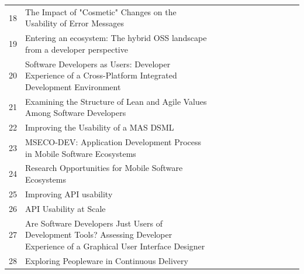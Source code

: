 \documentclass[english, 12pt, a4paper, sci, utf8, a-1b, online]{aaltothesis}
\begin{document}
\begin{center}
\begin{longtable}{p{0.05\linewidth}p{0.65\linewidth}p{0.30\linewidth}}
    18 & The Impact of "Cosmetic" Changes on the Usability of Error Messages                                                                         & \cite{dong2019impact}                             \\
    19 & Entering an ecosystem: The hybrid OSS landscape from a developer perspective                                                                & \cite{entering-an-ecosystem}                      \\
    20 & Software Developers as Users: Developer Experience of a Cross-Platform Integrated Development Environment                                   & \cite{software-developers-as-users}               \\
    21 & Examining the Structure of Lean and Agile Values Among Software Developers                                                                  & \cite{fagerholm2014examining}                     \\
    22 & Improving the Usability of a MAS DSML                                                                                                       & \cite{miranda2018improving}                       \\
    23 & MSECO-DEV: Application Development Process in Mobile Software Ecosystems                                                                    & \cite{fontao2016mseco}                            \\
    24 & Research Opportunities for Mobile Software Ecosystems                                                                                       & \cite{fontao2015research}                         \\
    25 & Improving API usability                                                                                                                     & \cite{myers2016improving}                         \\
    26 & API Usability at Scale                                                                                                                      & \cite{macvean2016api}                             \\
    27 & Are Software Developers Just Users of Development Tools? Assessing Developer Experience of a Graphical User Interface Designer              & \cite{kuusinen2016software}                       \\
    28 & Exploring Peopleware in Continuous Delivery                                                                                                 & \cite{karpanoja2016exploring}                     \\

\end{longtable}
\end{center}
\end{document}
